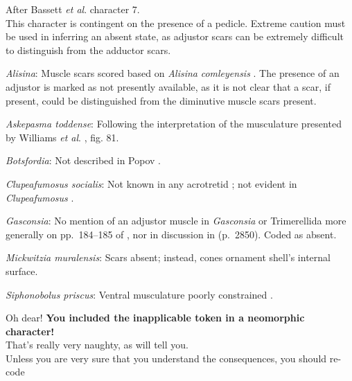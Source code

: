 \documentclass[openany]{book}
\theoremstyle{definition}
\theoremstyle{definition}
\theoremstyle{definition}
\theoremstyle{remark}
\begin{document}
After Bassett \emph{et al}.
\citeyearpar{Bassett2001Functionalmorphology} character 7.\\
This character is contingent on the presence of a pedicle. Extreme
caution must be used in inferring an absent state, as adjustor scars can
be extremely difficult to distinguish from the adductor scars.

\hypertarget{Alisina-coding-68}{}
\emph{Alisina}: Muscle scars scored based on \emph{Alisina}
\emph{comleyensis} \citep{Bassett2001Functionalmorphology}. The presence
of an adjustor is marked as not presently available, as it is not clear
that a scar, if present, could be distinguished from the diminutive
muscle scars present.

\hypertarget{Askepasma_toddense-coding-68}{}
\emph{Askepasma toddense}: Following the interpretation of the
musculature presented by Williams \emph{et al}.
\citeyearpar{Williams2000LinguliformeaCraniiformea}, fig. 81.

\hypertarget{Botsfordia-coding-68}{}
\emph{Botsfordia}: Not described in Popov
\citeyearpar{Popov1992TheCambrian}.

\hypertarget{Clupeafumosus_socialis-coding-68}{}
\emph{Clupeafumosus socialis}: Not known in any acrotretid
\citep{Williams2000LinguliformeaCraniiformea}; not evident in
\emph{Clupeafumosus} \citep{Topper2013Reappraisalof}.

\hypertarget{Gasconsia-coding-68}{}
\emph{Gasconsia}: No mention of an adjustor muscle in \emph{Gasconsia}
or Trimerellida more generally on pp.~184--185 of
\citet{Williams2000LinguliformeaCraniiformea}, nor in discussion in
\citet{Williams2007Supplement} (p.~2850). Coded as absent.

\hypertarget{Mickwitzia_muralensis-coding-68}{}
\emph{Mickwitzia muralensis}: Scars absent; instead, cones ornament
shell's internal surface.

\hypertarget{Siphonobolus_priscus-coding-68}{}
\emph{Siphonobolus priscus}: Ventral musculature poorly constrained
\citep{Williams2000LinguliformeaCraniiformea, Popov2009Earlyontogeny}.

Oh dear! \textbf{You included the inapplicable token in a neomorphic
character!}\\
That's really very naughty, as \citet{Brazeau2018} will tell you.\\
Unless you are very sure that you understand the consequences, you
should re-code
\end{document}
